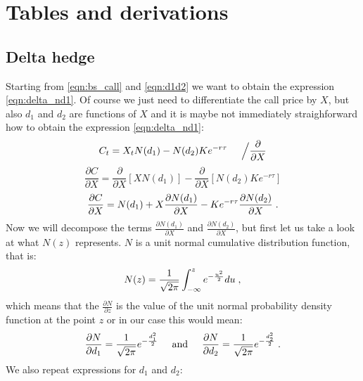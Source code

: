 \documentclass[times, utf8, diplomski]{fer}
\begin{document}
\appendix
\chapter{Tables and derivations}
\section{Delta hedge} \label{sec:obtain_delta_hedge}

Starting from \ref{eqn:bs_call} and \ref{eqn:d1d2} we want to obtain the expression \ref{eqn:delta_nd1}. Of course we just need to differentiate the call price by $X$, but also $d_1$ and $d_2$ are functions of $X$ and it is maybe not immediately straighforward how to obtain the expression \ref{eqn:delta_nd1}:
\begin{equation*}
	C_t = X_tN(d_1) - N(d_2)Ke^{-r\tau} \hspace{0.5cm} \Big/ \frac{\partial}{\partial X}
\end{equation*}
\begin{equation*}
	\frac{\partial C}{\partial X} = \frac{\partial}{\partial X}\left[ XN(d_1) \right] - \frac{\partial}{\partial X} \left[ N(d_2)Ke^{-r\tau} \right]
\end{equation*}
\begin{equation} \label{eqn:dC_dX}
	\frac{\partial C}{\partial X} = N(d_1) + X\frac{\partial N(d_1)}{\partial X} - Ke^{-r\tau}\frac{\partial N(d_2)}{\partial X} \hspace{0.1cm}.
\end{equation} Now we will decompose the terms $\frac{\partial N(d_1)}{\partial X}$ and $\frac{\partial N(d_2)}{\partial X}$, but first let us take a look at what $N(z)$ represents. $N$ is a unit normal cumulative distribution function, that is:
\begin{equation} 
	N(z) = \frac{1}{\sqrt{2\pi}} \int_{-\infty}^{z} e^{-\frac{u^2}{2}}du \hspace{0.1cm},
\end{equation} which means that the $\frac{\partial N}{\partial z}$ is the value of the unit normal probability density function at the point $z$ or in our case this would mean:
\begin{equation}
	\frac{\partial N}{\partial d_1} = \frac{1}{\sqrt{2\pi}} e^{-\frac{d_1^2}{2}} \hspace{0.5cm} \mbox{and} \hspace{0.5cm} \frac{\partial N}{\partial d_2} = \frac{1}{\sqrt{2\pi}} e^{-\frac{d_2^2}{2}} \hspace{0.1cm}.
\end{equation} We also repeat expressions for $d_1$ and $d_2$:
\end{document}
